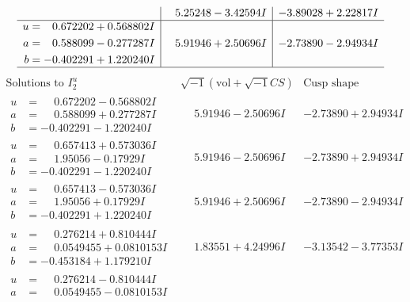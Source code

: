 \documentclass[1p]{elsarticle_modified}
\theoremstyle{definition}
\newcommand{\I}{\sqrt{-1}}
\begin{document}
$$\begin{array}{c|c|c}
 & \phantom{-}5.25248 - 3.42594 I & -3.89028 + 2.22817 I \\ \hline\begin{aligned}
u &= \phantom{-}0.672202 + 0.568802 I \\
a &= \phantom{-}0.588099 - 0.277287 I \\
b &= -0.402291 + 1.220240 I\end{aligned}
 & \phantom{-}5.91946 + 2.50696 I & -2.73890 - 2.94934 I\\
 \hline 
 \end{array}$$\newpage$$\begin{array}{c|c|c}  
\text{Solutions to }I^u_{2}& \I (\text{vol} + \sqrt{-1}CS) & \text{Cusp shape}\\
 \hline 
\begin{aligned}
u &= \phantom{-}0.672202 - 0.568802 I \\
a &= \phantom{-}0.588099 + 0.277287 I \\
b &= -0.402291 - 1.220240 I\end{aligned}
 & \phantom{-}5.91946 - 2.50696 I & -2.73890 + 2.94934 I \\ \hline\begin{aligned}
u &= \phantom{-}0.657413 + 0.573036 I \\
a &= \phantom{-}1.95056 - 0.17929 I \\
b &= -0.402291 - 1.220240 I\end{aligned}
 & \phantom{-}5.91946 - 2.50696 I & -2.73890 + 2.94934 I \\ \hline\begin{aligned}
u &= \phantom{-}0.657413 - 0.573036 I \\
a &= \phantom{-}1.95056 + 0.17929 I \\
b &= -0.402291 + 1.220240 I\end{aligned}
 & \phantom{-}5.91946 + 2.50696 I & -2.73890 - 2.94934 I \\ \hline\begin{aligned}
u &= \phantom{-}0.276214 + 0.810444 I \\
a &= \phantom{-}0.0549455 + 0.0810153 I \\
b &= -0.453184 + 1.179210 I\end{aligned}
 & \phantom{-}1.83551 + 4.24996 I & -3.13542 - 3.77353 I \\ \hline\begin{aligned}
u &= \phantom{-}0.276214 - 0.810444 I \\
a &= \phantom{-}0.0549455 - 0.0810153 I \\

\end{aligned}
\end{array}$$
\end{document}
